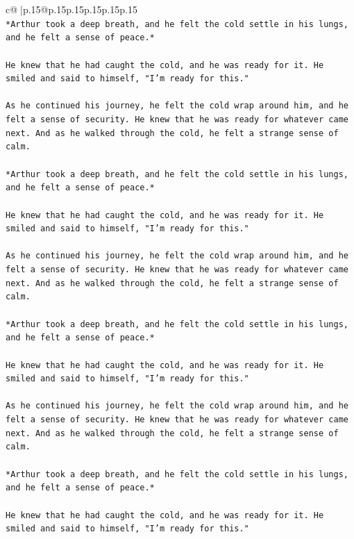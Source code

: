 \documentclass{article}
\begin{document}
{\begin{supertabular}{c@{$\;$}|p{.15\linewidth}@{}p{.15\linewidth}p{.15\linewidth}p{.15\linewidth}p{.15\linewidth}p{.15\linewidth}}
{{{\\ 
\texttt{*Arthur took a deep breath, and he felt the cold settle in his lungs, and he felt a sense of peace.*} \\
\\ 
\texttt{He knew that he had caught the cold, and he was ready for it. He smiled and said to himself, "I'm ready for this."} \\
\\ 
\texttt{As he continued his journey, he felt the cold wrap around him, and he felt a sense of security. He knew that he was ready for whatever came next. And as he walked through the cold, he felt a strange sense of calm.} \\
\\ 
\texttt{*Arthur took a deep breath, and he felt the cold settle in his lungs, and he felt a sense of peace.*} \\
\\ 
\texttt{He knew that he had caught the cold, and he was ready for it. He smiled and said to himself, "I'm ready for this."} \\
\\ 
\texttt{As he continued his journey, he felt the cold wrap around him, and he felt a sense of security. He knew that he was ready for whatever came next. And as he walked through the cold, he felt a strange sense of calm.} \\
\\ 
\texttt{*Arthur took a deep breath, and he felt the cold settle in his lungs, and he felt a sense of peace.*} \\
\\ 
\texttt{He knew that he had caught the cold, and he was ready for it. He smiled and said to himself, "I'm ready for this."} \\
\\ 
\texttt{As he continued his journey, he felt the cold wrap around him, and he felt a sense of security. He knew that he was ready for whatever came next. And as he walked through the cold, he felt a strange sense of calm.} \\
\\ 
\texttt{*Arthur took a deep breath, and he felt the cold settle in his lungs, and he felt a sense of peace.*} \\
\\ 
\texttt{He knew that he had caught the cold, and he was ready for it. He smiled and said to himself, "I'm ready for this."} \\
\\ 
}}}
\end{supertabular}}
\end{document}
